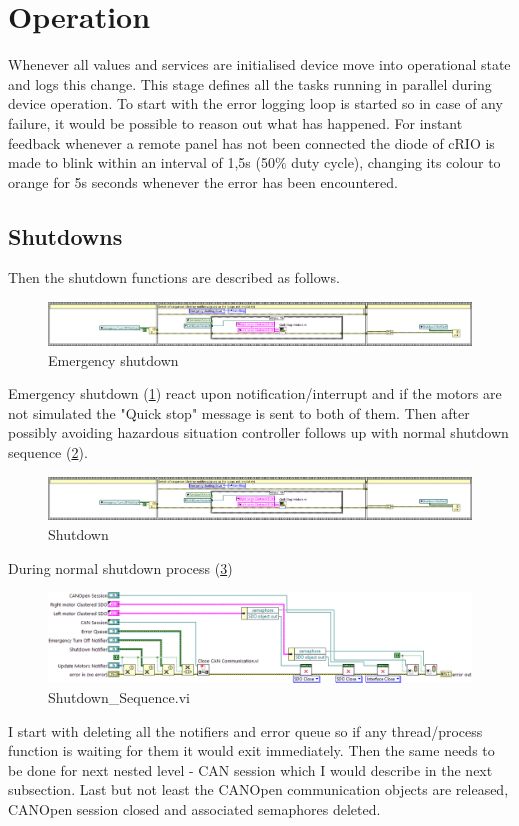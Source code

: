 \section{Operation}
Whenever all values and services are initialised device move into operational state and logs this change.
This stage defines all the tasks running in parallel during device operation. To start with the error logging loop is started so in case of any failure, it would be possible to reason out what has happened. 
For instant feedback whenever a remote panel has not been connected the diode of cRIO is made to blink within an interval of 1,5s (50$\%$ duty cycle), changing its colour to orange for 5s seconds whenever the error has been encountered.\label{cRIO_LED}

\subsection{Shutdowns}
Then the shutdown functions are described as follows.
\begin{figure}[h]
    \centering
    \includegraphics[scale=\visc,max width=\textwidth]{figures/Emergency_turn_off}
    \caption{Emergency shutdown}
    \label{vi:emc_shut}
\end{figure}
Emergency shutdown (\ref{vi:emc_shut}) react upon notification/interrupt and if the motors are not simulated the "Quick stop" message is sent to both of them. Then after possibly avoiding hazardous situation controller follows up with normal shutdown sequence (\ref{vi:shut}).
\begin{figure}[h]
    \centering
    \includegraphics[scale=\visc,max width=\textwidth]{figures/Emergency_turn_off}
    \caption{Shutdown}
    \label{vi:shut}
\end{figure}

During normal shutdown process (\ref{vi:shut_seq})
\begin{figure}[h]
    \centering
    \includegraphics[scale=\visc,max width=\textwidth]{figures/Shutdown_Sequenced}
    \caption{Shutdown\_Sequence.vi}
    \label{vi:shut_seq}
\end{figure}
I start with deleting all the notifiers and error queue so if any thread/process function is waiting for them it would exit immediately.
Then the same needs to be done for next nested level - CAN session which I would describe in the next subsection.
Last but not least the CANOpen communication objects are released, CANOpen session closed and associated semaphores deleted. 

